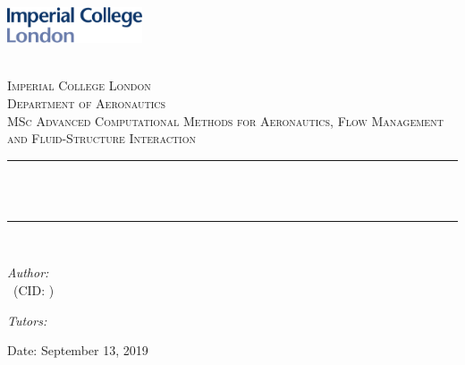 \begin{titlepage}

\newcommand{\HRule}{\rule{\linewidth}{0.5mm}} %



\includegraphics[width = 4cm]{./figures/imperial}\\[0.5cm] 

\begin{center} %

\textsc{\LARGE \reporttype}\\[1.5cm] 
\textsc{\Large Imperial College London}\\[0.5cm] 
\textsc{\large Department of Aeronautics}\\[0.5cm] 
\textsc{\Large MSc Advanced Computational Methods for Aeronautics, Flow Management and Fluid-Structure Interaction}\\[0.5cm] 


\HRule \\[0.4cm]
{\Large{\textbf{\reporttitle}}}\\ %
\HRule \\[2cm]
\end{center}

\begin{flushleft} \large
\textit{Author:}\\
\reportauthor~(CID: \cid) %
\end{flushleft}

\begin{flushleft} \large
\textit{Tutors:}\\
\reporttutors %
\end{flushleft}

\vspace{2cm}
\makeatletter
Date: September 13, 2019

\vfill %



\makeatother


\end{titlepage}

